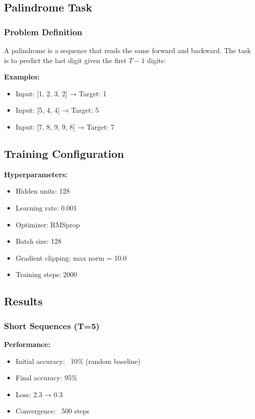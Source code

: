 \documentclass[11pt,a4paper]{article}
\begin{document}
\subsection{Palindrome Task}

\subsubsection{Problem Definition}

A palindrome is a sequence that reads the same forward and backward. The task is to predict the last digit given the first $T-1$ digits:

\textbf{Examples:}
\begin{itemize}
    \item Input: [1, 2, 3, 2] → Target: 1
    \item Input: [5, 4, 4] → Target: 5
    \item Input: [7, 8, 9, 9, 8] → Target: 7
\end{itemize}

\subsection{Training Configuration}

\textbf{Hyperparameters:}
\begin{itemize}
    \item Hidden units: 128
    \item Learning rate: 0.001
    \item Optimizer: RMSprop
    \item Batch size: 128
    \item Gradient clipping: max norm = 10.0
    \item Training steps: 2000
\end{itemize}

\subsection{Results}

\subsubsection{Short Sequences (T=5)}

\textbf{Performance:}
\begin{itemize}
    \item Initial accuracy: ~10\% (random baseline)
    \item Final accuracy: 95\%
    \item Loss: 2.3 → 0.3
    \item Convergence: ~500 steps
\end{itemize}
\end{document}

